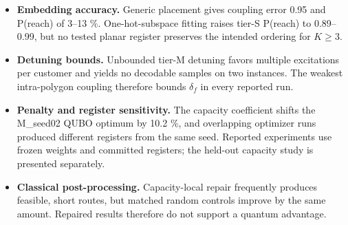 \documentclass[9pt,a4paper]{extarticle}
\providecommand{\tightlist}{\setlength{\itemsep}{0pt}\setlength{\parskip}{0pt}}
\begin{document}
\begin{itemize}
\tightlist
\item
  \textbf{Embedding accuracy.} Generic placement gives coupling error
  0.95 and P(reach) of 3--13 \%. One-hot-subspace fitting raises tier-S
  P(reach) to 0.89--0.99, but no tested planar register preserves the
  intended ordering for \(K\ge3\).
\item
  \textbf{Detuning bounds.} Unbounded tier-M detuning favors multiple
  excitations per customer and yields no decodable samples on two
  instances. The weakest intra-polygon coupling therefore bounds
  \(\delta_f\) in every reported run.
\item
  \textbf{Penalty and register sensitivity.} The capacity coefficient
  shifts the M\_seed02 QUBO optimum by 10.2 \%, and overlapping
  optimizer runs produced different registers from the same seed.
  Reported experiments use frozen weights and committed registers; the
  held-out capacity study is presented separately.
\item
  \textbf{Classical post-processing.} Capacity-local repair frequently
  produces feasible, short routes, but matched random controls improve
  by the same amount. Repaired results therefore do not support a
  quantum advantage.
\end{itemize}
\end{document}
